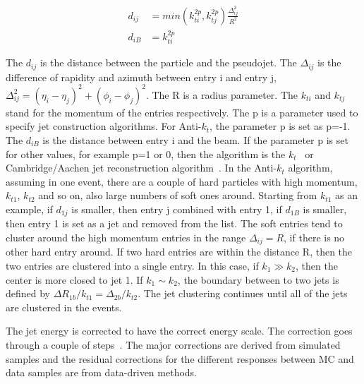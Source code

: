 \begin{align*}
d_{ij}&=min(k_{ti}^{2p},k_{tj}^{2p})\frac{\Delta_{ij}^{2}}{R^{2}}\\
d_{iB}&=k_{ti}^{2p}
\end{align*}

The $d_{ij}$ is the distance between the particle and the pseudojet. The $\Delta_{ij}$ is the difference of rapidity and azimuth between entry i and entry j, $\Delta_{ij}^{2}=(\eta_{i}-\eta_{j})^{2}+(\phi_{i}-\phi_{j})^{2}$. The R is a radius parameter. The $k_{ti}$ and $k_{tj}$ stand for the momentum of the entries respectively. The p is a parameter used to specify jet construction algorithms.  For Anti-$k_{t}$, the parameter p is set as p=-1. The $d_{iB}$ is the distance between entry i and the beam. If the parameter p is set for other values, for example p=1 or 0, then the algorithm is the $k_t$~\cite{ktalgo} or Cambridge/Aachen jet reconstruction algorithm~\cite{Aachenjetalgo}.  In the Anti-$k_{t}$ algorithm, assuming in one event, there are a couple of hard particles with high momentum, $k_{t1}$, $k_{t2}$ and so on, also large numbers of soft ones around. Starting from $k_{t1}$ as an example, if $d_{1j}$ is smaller, then entry j combined with entry 1, if $d_{1B}$ is smaller, then entry 1 is set as a jet and removed from the list. The soft entries tend to cluster around the high momentum entries in the range $\Delta_{ij}= R$, if there is no other hard entry around. If two hard entries are within the distance R, then the two entries are clustered into a single entry. In this case, if $k_{1}\gg k_{2}$, then the center is more closed to jet 1. If $k_{1}\sim k_{2}$, the boundary between to two jets is defined by $\Delta R_{1b}/k_{t1}=\Delta_{2b}/k_{t2}$. The jet clustering continues until all of the jets are clustered in the events. 

The jet energy is corrected to have the correct energy scale.  The correction goes through a couple of steps~\cite{jetenergycorrection}. The major corrections are derived from simulated samples and the residual corrections for the different responses between MC and data samples are from data-driven methods. 

